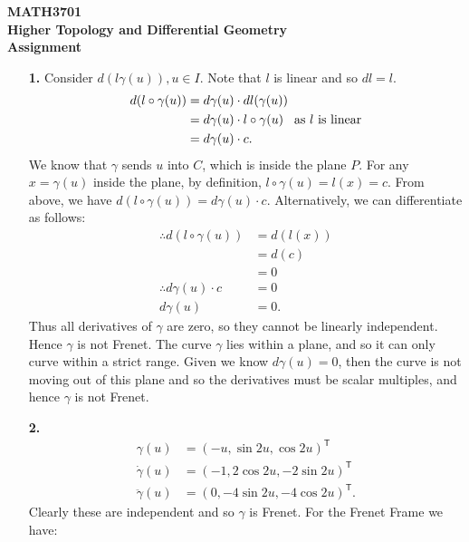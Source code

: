\documentclass[a4paper]{article}
\begin{document}
\begin{center}
  \vspace{-3mm}
	\textbf{\large {MATH3701 \\
	Higher Topology and Differential Geometry \\
	Assignment}}
\end{center}
\vspace{-5mm}

\begin{enumerate}[leftmargin=\labelsep]
\item[\textbf{1.}]
	Consider $d(l \gamma(u)), u \in I$. Note that $l$ is linear and so $dl = l$.
	\begin{align*}
		d(l \circ \gamma(u)) & = d\gamma(u) \cdot dl(\gamma(u)) \\
		& = d\gamma(u) \cdot l \circ \gamma(u) \hspace{3mm} \text{as $l$ is linear} \\
		& = d\gamma(u) \cdot c.
	\end{align*}
		We know that $\gamma$ sends $u$ into $C$, which is inside the plane $P$. For any $x = \gamma(u)$ inside the plane, by definition, $l \circ \gamma(u) =l(x) = c$. From above, we have $d(l \circ \gamma(u)) = d\gamma(u) \cdot c$. Alternatively, we can differentiate as follows:
	\begin{align*}
		\therefore d(l \circ \gamma(u)) & = d(l(x)) \\
		& = d(c) \\
		& = 0 \\
		\therefore d\gamma(u) \cdot c & = 0 \\
		d\gamma(u) & = 0.
	\end{align*}
		Thus all derivatives of $\gamma$ are zero, so they cannot be linearly independent. Hence $\gamma$ is not Frenet. The curve $\gamma$ lies within a plane, and so it can only curve within a strict range. Given we know $d \gamma(u) = 0$, then the curve is not moving out of this plane and so the derivatives must be scalar multiples, and hence $\gamma$ is not Frenet.
\item[\textbf{2.}]
	\begin{align*}
		\gamma(u) & = (-u,\sin{2u}, \cos{2u})^\mathsf{T} \\
		\dot{\gamma}(u) & = (-1, 2\cos{2u}, -2\sin{2u})^\mathsf{T} \\
		\ddot{\gamma}(u) & = (0, -4\sin{2u}, -4\cos{2u})^\mathsf{T}.
	\end{align*}
	Clearly these are independent and so $\gamma$ is Frenet. For the Frenet Frame we have:

\end{enumerate}
\end{document}
